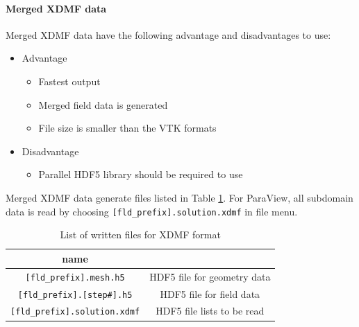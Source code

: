 \paragraph{Merged XDMF data}
Merged XDMF data have the following advantage and disadvantages to use:
%
\begin{itemize}
\item Advantage
\begin{itemize} 
\item Fastest output
\item Merged field data is generated
\item File size is smaller than the VTK formats
\end{itemize}
\item Disadvantage
\begin{itemize} 
\item Parallel HDF5 library should be required to use
\end{itemize}
\end{itemize}
%
Merged XDMF data generate files listed in Table \ref{table:XDMF}. For ParaView, all subdomain data is read by choosing \verb|[fld_prefix].solution.xdmf| in file menu.
%
\begin{table}[htp]
\caption{List of written files for XDMF format}
\begin{center} 
\begin{tabular}{|c|c|}
\hline
 name &  \\ \hline \hline
\verb|[fld_prefix].mesh.h5|  & HDF5 file for geometry data \\ \hline
\verb|[fld_prefix].[step#].h5|  &HDF5 file for field data   \\ \hline
\verb|[fld_prefix].solution.xdmf|  & HDF5 file lists to be read  \\ \hline
\end{tabular}
\end{center}
\label{table:XDMF}
\end{table}
%
